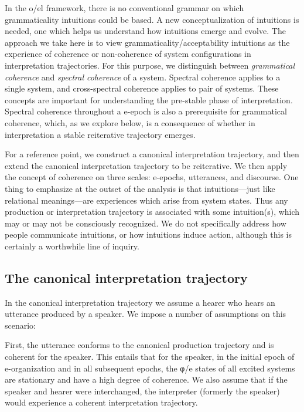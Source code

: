 In the o/el framework, there is no conventional grammar on which grammaticality intuitions could be based. A new conceptualization of intuitions is needed, one which helps us understand how intuitions emerge and evolve. The approach we take here is to view grammaticality/acceptability intuitions as the experience of coherence or non-coherence of system configurations in interpretation trajectories. For this purpose, we distinguish between \textit{grammatical coherence} and \textit{spectral coherence} of a system. Spectral coherence applies to a single system, and cross-spectral coherence applies to pair of systems. These concepts are important for understanding the pre-stable phase of interpretation. Spectral coherence throughout a e-epoch is also a prerequisite for grammatical coherence, which, as we explore below, is a consequence of whether in interpretation a stable reiterative trajectory emerges.

For a reference point, we construct a canonical interpretation trajectory, and then extend the canonical interpretation trajectory to be reiterative. We then apply the concept of coherence on three scales: e-epochs, utterances, and discourse. One thing to emphasize at the outset of the analysis is that intuitions—just like relational meanings—are experiences which arise from system states. Thus any production or interpretation trajectory is associated with some intuition(s), which may or may not be consciously recognized. We do not specifically address how people communicate intuitions, or how intuitions induce action, although this is certainly a worthwhile line of inquiry.

\subsection{The canonical interpretation trajectory}

In the canonical interpretation trajectory we assume a hearer who hears an utterance produced by a speaker. We impose a number of assumptions on this scenario:

First, the utterance conforms to the canonical production trajectory and is coherent for the speaker. This entails that for the speaker, in the initial epoch of e-organization and in all subsequent epochs, the φ/e states of all excited systems are stationary and have a high degree of coherence. We also assume that if the speaker and hearer were interchanged, the interpreter (formerly the speaker) would experience a coherent interpretation trajectory. 

